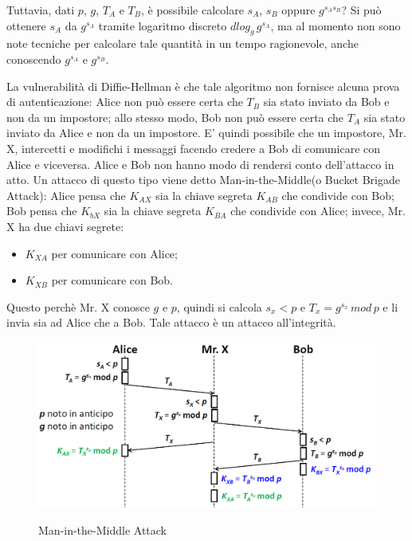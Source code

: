 Tuttavia, dati $p$, $g$, $T_{A}$ e $T_{B}$, è possibile calcolare $s_{A}$, $s_{B}$ oppure $g^{s_{A}s_{B}}$? Si può ottenere $s_{A}$ da $g^{s_{A}}$ tramite logaritmo discreto $dlog_{g} \, g^{s_{A}}$, ma al momento non sono note tecniche per calcolare tale quantità in un tempo ragionevole, anche conoscendo $g^{s_{A}}$ e $g^{s_{B}}$.

La vulnerabilità di Diffie-Hellman è che tale algoritmo non fornisce alcuna prova di autenticazione: Alice non può essere certa che $T_{B}$ sia stato inviato da Bob e non da un impostore; allo stesso modo, Bob non può essere certa che $T_{A}$ sia stato inviato da Alice e non da
un impostore. E' quindi possibile che un impostore, Mr. X, intercetti e modifichi i messaggi facendo credere a Bob di comunicare con Alice e
viceversa. Alice e Bob non hanno modo di rendersi conto dell'attacco in atto. Un attacco di questo tipo viene detto Man-in-the-Middle(o Bucket Brigade Attack): Alice pensa che $K_{AX}$ sia la chiave segreta $K_{AB}$ che condivide con Bob; Bob pensa che $K_{bX}$ sia la chiave segreta $K_{BA}$ che condivide con Alice; invece, Mr. X ha due chiavi segrete: \begin{itemize}
\item $K_{XA}$ per comunicare con Alice;
\item $K_{XB}$ per comunicare con Bob.
\end{itemize}
Questo perchè Mr. X conosce $g$ e $p$, quindi si calcola $s_{x}<p$ e $T_{x}=g^{s_{x}} \, mod \, p$ e li invia sia ad Alice che a Bob. Tale attacco è un attacco all'integrità. 
\begin{figure}[htbp]
	\centering%
	\subfigure%
	{\includegraphics[scale=0.5, keepaspectratio]{Immagini/chiave_pubblica/DiffieHellman_maninthemiddle.png}}
	\caption{Man-in-the-Middle Attack}
	\end{figure}
	
